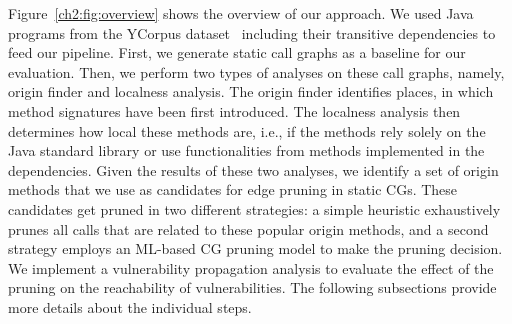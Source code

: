 Figure~\ref{ch2:fig:overview} shows the overview of our approach. We used Java programs from the YCorpus dataset~\cite{mir2023effect} including their transitive dependencies to feed our pipeline. First, we generate static call graphs as a baseline for our evaluation.
Then, we perform two types of analyses on these call graphs, namely, origin finder and localness analysis. The origin finder identifies places, in which method signatures have been first introduced. The localness analysis then determines how local these methods are, i.e., if the methods rely solely on the Java standard library or use functionalities from methods implemented in the dependencies. Given the results of these two analyses, we identify a set of origin methods that we use as candidates for edge pruning in static CGs.
These candidates get pruned in two different strategies: a simple heuristic exhaustively prunes all calls that are related to these popular origin methods, and a second strategy employs an ML-based CG pruning model to make the pruning decision.
We implement a vulnerability propagation analysis to evaluate the effect of the pruning on the reachability of vulnerabilities.
The following subsections provide more details about the individual steps.

